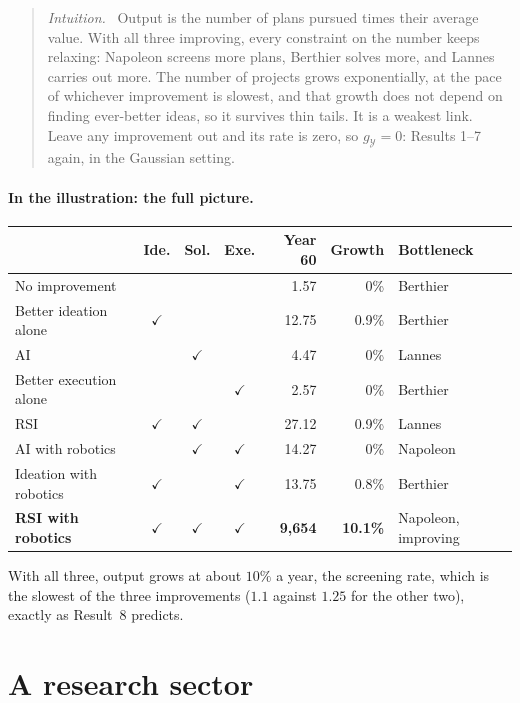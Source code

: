 \documentclass[11pt]{article}
\newcommand{\Nap}{\textcolor{nap}{Napoleon}}
\newcommand{\Ber}{\textcolor{ber}{Berthier}}
\newcommand{\Lan}{\textcolor{lan}{Lannes}}
\theoremstyle{remark}
\newenvironment{intuition}{\begin{quote}\small\color{muted}\textit{Intuition.}\ }{\end{quote}}
\newcommand{\Ycal}{\mathcal{Y}}
\begin{document}
\begin{intuition}
Output is the number of plans pursued times their average value. With all three improving, every constraint on the number keeps relaxing: \Nap{} screens more plans, \Ber{} solves more, and \Lan{} carries out more. The number of projects grows exponentially, at the pace of whichever improvement is slowest, and that growth does not depend on finding ever-better ideas, so it survives thin tails. It is a weakest link. Leave any improvement out and its rate is zero, so $g_{\Ycal}=0$: Results 1--7 again, in the Gaussian setting.
\end{intuition}

\paragraph{In the illustration: the full picture.}
\begin{center}
\renewcommand{\arraystretch}{1.12}
\begin{tabular}{@{}l c c c r r l@{}}
\toprule
& \textcolor{nap}{Ide.} & \textcolor{ber}{Sol.} & \textcolor{lan}{Exe.} & Year 60 & Growth & Bottleneck\\
\midrule
No improvement & & & & 1.57 & 0\% & \Ber\\
Better ideation alone & $\checkmark$ & & & 12.75 & 0.9\% & \Ber\\
\textcolor{ber}{AI} & & $\checkmark$ & & 4.47 & 0\% & \Lan\\
Better execution alone & & & $\checkmark$ & 2.57 & 0\% & \Ber\\
\midrule
\textcolor{nap}{RSI} & $\checkmark$ & $\checkmark$ & & 27.12 & 0.9\% & \Lan\\
\textcolor{lan}{AI with robotics} & & $\checkmark$ & $\checkmark$ & 14.27 & 0\% & \Nap\\
Ideation with robotics & $\checkmark$ & & $\checkmark$ & 13.75 & 0.8\% & \Ber\\
\midrule
\textbf{RSI with robotics} & $\checkmark$ & $\checkmark$ & $\checkmark$ & \textbf{9{,}654} & \textbf{10.1\%} & \Nap, improving\\
\bottomrule
\end{tabular}
\end{center}
With all three, output grows at about $10\%$ a year, the screening rate, which is the slowest of the three improvements ($1.1$ against $1.25$ for the other two), exactly as Result~8 predicts.

\section{A research sector}\label{sec:research}
\end{document}
